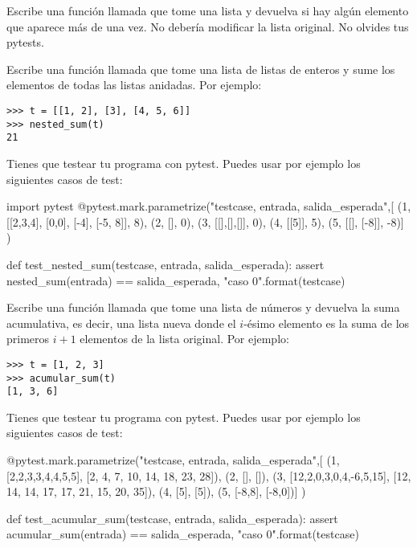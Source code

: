 \begin{exercise}
\label{duplicate}

Escribe una función llamada  que tome
una lista y devuelva  si hay algún elemento que
aparece más de una vez.  No debería modificar la lista
original. No olvides tus pytests.


\end{exercise}




\begin{exercise}

Escribe una función llamada  que tome una lista de listas
de enteros y sume los elementos de todas las listas anidadas.
Por ejemplo:

\begin{Verbatim}[frame=single]
>>> t = [[1, 2], [3], [4, 5, 6]]
>>> nested_sum(t)
21
\end{Verbatim}

Tienes que testear tu programa con pytest. Puedes usar por ejemplo los siguientes casos de test:

\begin{python}
import pytest
@pytest.mark.parametrize("testcase, entrada, salida_esperada",[
(1, [[2,3,4], [0,0], [-4], [-5, 8]], 8),   
(2, [], 0),              
(3, [[],[],[]], 0),
(4, [[5]], 5),
(5, [[], [-8]], -8)]
)              

def test_nested_sum(testcase, entrada, salida_esperada):
    assert nested_sum(entrada) == salida_esperada, "caso {0}".format(testcase)
\end{python}


\end{exercise}

\begin{exercise}
\label{cumulative}

Escribe una función llamada  que tome una lista de números y
devuelva la suma acumulativa, es decir, una lista nueva donde el $i$-ésimo
elemento es la suma de los primeros $i+1$ elementos de la lista original.
Por ejemplo:

\begin{Verbatim}[frame=single]
>>> t = [1, 2, 3]
>>> acumular_sum(t)
[1, 3, 6]
\end{Verbatim}

Tienes que testear tu programa con pytest. Puedes usar por ejemplo los siguientes casos de test:

\begin{python}
@pytest.mark.parametrize("testcase, entrada, salida_esperada",[
(1, [2,2,3,3,4,4,5,5], [2, 4, 7, 10, 14, 18, 23, 28]),   
(2, [], []),              
(3, [12,2,0,3,0,4,-6,5,15], [12, 14, 14, 17, 17, 21, 15, 20, 35]),
(4, [5], [5]),
(5, [-8,8], [-8,0])]
)              

def test_acumular_sum(testcase, entrada, salida_esperada):
    assert acumular_sum(entrada) == salida_esperada, "caso {0}".format(testcase)
\end{python}


\end{exercise}

